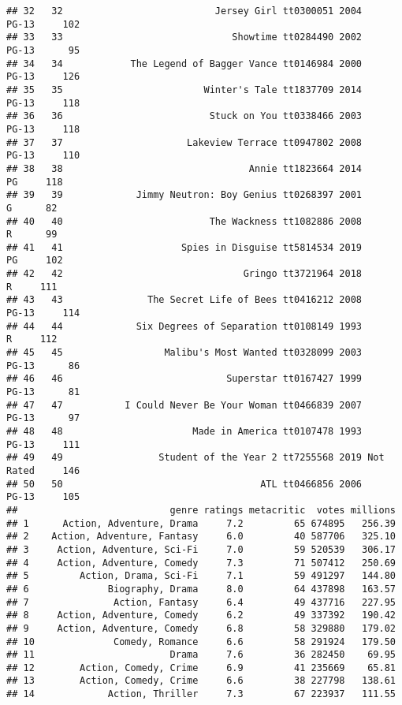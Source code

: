 \documentclass[
]{article}
\begin{document}
\begin{verbatim}
## 32   32                           Jersey Girl tt0300051 2004     PG-13     102
## 33   33                              Showtime tt0284490 2002     PG-13      95
## 34   34            The Legend of Bagger Vance tt0146984 2000     PG-13     126
## 35   35                         Winter's Tale tt1837709 2014     PG-13     118
## 36   36                          Stuck on You tt0338466 2003     PG-13     118
## 37   37                      Lakeview Terrace tt0947802 2008     PG-13     110
## 38   38                                 Annie tt1823664 2014        PG     118
## 39   39             Jimmy Neutron: Boy Genius tt0268397 2001         G      82
## 40   40                          The Wackness tt1082886 2008         R      99
## 41   41                     Spies in Disguise tt5814534 2019        PG     102
## 42   42                                Gringo tt3721964 2018         R     111
## 43   43               The Secret Life of Bees tt0416212 2008     PG-13     114
## 44   44             Six Degrees of Separation tt0108149 1993         R     112
## 45   45                  Malibu's Most Wanted tt0328099 2003     PG-13      86
## 46   46                             Superstar tt0167427 1999     PG-13      81
## 47   47           I Could Never Be Your Woman tt0466839 2007     PG-13      97
## 48   48                       Made in America tt0107478 1993     PG-13     111
## 49   49                 Student of the Year 2 tt7255568 2019 Not Rated     146
## 50   50                                   ATL tt0466856 2006     PG-13     105
##                           genre ratings metacritic  votes millions
## 1      Action, Adventure, Drama     7.2         65 674895   256.39
## 2    Action, Adventure, Fantasy     6.0         40 587706   325.10
## 3     Action, Adventure, Sci-Fi     7.0         59 520539   306.17
## 4     Action, Adventure, Comedy     7.3         71 507412   250.69
## 5         Action, Drama, Sci-Fi     7.1         59 491297   144.80
## 6              Biography, Drama     8.0         64 437898   163.57
## 7               Action, Fantasy     6.4         49 437716   227.95
## 8     Action, Adventure, Comedy     6.2         49 337392   190.42
## 9     Action, Adventure, Comedy     6.8         58 329880   179.02
## 10              Comedy, Romance     6.6         58 291924   179.50
## 11                        Drama     7.6         36 282450    69.95
## 12        Action, Comedy, Crime     6.9         41 235669    65.81
## 13        Action, Comedy, Crime     6.6         38 227798   138.61
## 14             Action, Thriller     7.3         67 223937   111.55

\end{verbatim}
\end{document}
